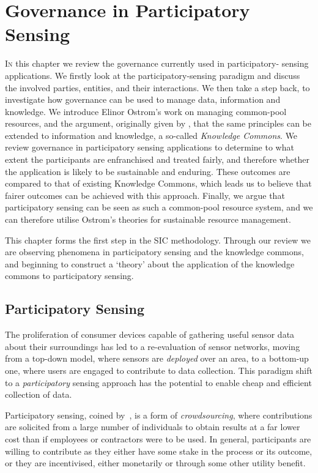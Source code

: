 \acresetall
\chapter{Governance in Participatory Sensing}\label{ch:kc}

\lettrine[lines=3]{I}{n} this chapter we review the governance currently used in participatory-
sensing applications. We firstly look at the participatory-sensing paradigm
and discuss the involved parties, entities, and their interactions. We then
take a step back, to investigate how governance can be used to manage data,
information and knowledge. We introduce Elinor Ostrom's work on managing
common-pool resources, and the argument, originally given by
\citet{Ostrom2003}, that the same principles can be extended to information
and knowledge, a so-called \emph{Knowledge Commons}. We review governance in participatory sensing
applications to determine to what extent the participants are enfranchised and
treated fairly, and therefore whether the application is likely to be
sustainable and enduring. These outcomes are compared to that of existing
Knowledge Commons, which leads us to believe that fairer outcomes can be
achieved with this approach. Finally, we argue that
participatory sensing can be seen as such a common-pool resource system, and we can
therefore utilise Ostrom's theories for sustainable resource
management. 

This chapter forms the first step in the \ac{SIC} methodology. Through our
review we are observing phenomena in participatory sensing and the knowledge
commons, and beginning to construct a `theory' about the application of the
knowledge commons to participatory sensing.

\section{Participatory Sensing}\label{sec:psense}

The proliferation of consumer devices capable of gathering useful sensor data
about their surroundings has led to a re-evaluation of sensor networks, moving
from a top-down model, where sensors are \emph{deployed} over an area, to a
bottom-up one, where users are engaged to contribute to data collection. This
paradigm shift to a \emph{participatory} sensing approach has the potential to
enable cheap and efficient collection of data.

Participatory sensing, coined by~\citet{Burke2006}, is a form of
\emph{crowdsourcing}, where contributions are solicited from a large number of
individuals to obtain results at a far lower cost than if employees or
contractors were to be used. In general, participants are willing to
contribute as they either have some stake in the process or its outcome, or
they are incentivised, either monetarily or through some other utility
benefit.

